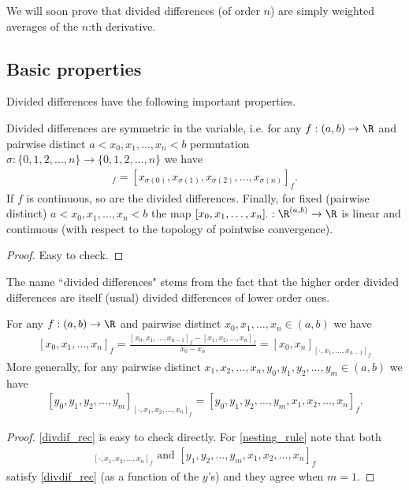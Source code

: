 We will soon prove that divided differences (of order $n$) are simply weighted averages of the $n$:th derivative.

\subsection{Basic properties}

Divided differences have the following important properties.

\begin{prop}
	Divided differences are symmetric in the variable, i.e. for any $f : (a, b) \to \R$ and pairwise distinct $a < x_{0}, x_{1}, \ldots, x_{n} < b$ permutation $\sigma : \{0, 1, 2, \ldots, n\} \to \{0, 1, 2, \ldots, n\}$ we have
	\begin{align*}
		[x_{0}, x_{1}, x_{2}, \ldots, x_{n}]_{f} = [x_{\sigma(0)}, x_{\sigma(1)}, x_{\sigma(2)}, \ldots, x_{\sigma(n)}]_{f}.
	\end{align*}
	If $f$ is continuous, so are the divided differences.
	Finally, for fixed (pairwise distinct) $a < x_{0}, x_{1}, \ldots, x_{n} < b$ the map $[x_{0}, x_{1}, \ldots, x_{n}]_{\cdot} : \R^{(a, b)} \to \R$ is linear and continuous (with respect to the topology of pointwise convergence).
\end{prop}
\begin{proof}
	Easy to check.
\end{proof}

The name ``divided differences" stems from the fact that the higher order divided differences are itself (usual) divided differences of lower order ones.

\begin{prop}\label{nesting_property}
	For any $f : (a, b) \to \R$ and pairwise distinct $x_{0}, x_{1}, \ldots, x_{n} \in (a, b)$ we have
	\begin{align}\label{divdif_rec}
		[x_{0}, x_{1}, \ldots, x_{n}]_{f} = \frac{[x_{0}, x_{1}, \ldots, x_{n - 1}]_{f} - [x_{1}, x_{2}, \ldots, x_{n}]_{f}}{x_{0} - x_{n}} = [x_{0}, x_{n}]_{[\cdot, x_{1}, \ldots, x_{n - 1}]_f}
	\end{align}
	More generally, for any pairwise distinct $x_{1}, x_{2}, \ldots, x_{n}, y_{0}, y_{1}, y_{2}, \ldots, y_{m} \in (a, b)$ we have
	\begin{align}\label{nesting_rule}
		[y_{0}, y_{1}, y_{2}, \ldots, y_{m}]_{[\cdot, x_{1}, x_{2}, \ldots, x_{n}]_{f}} = [y_{0}, y_{1}, y_{2}, \ldots, y_{m}, x_{1}, x_{2}, \ldots, x_{n}]_{f}.
	\end{align}
\end{prop}
\begin{proof}
	\ref{divdif_rec} is easy to check directly. For \ref{nesting_rule} note that both
	\begin{align*}
		[y_{1}, y_{2}, \ldots, y_{m}]_{[\cdot, x_{1}, x_{2}, \ldots, x_{n}]_{f}} \text{ and } [y_{1}, y_{2}, \ldots, y_{m}, x_{1}, x_{2}, \ldots, x_{n}]_{f}
	\end{align*}
	satisfy \ref{divdif_rec} (as a function of the $y$'s) and they agree when $m = 1$.
\end{proof}

